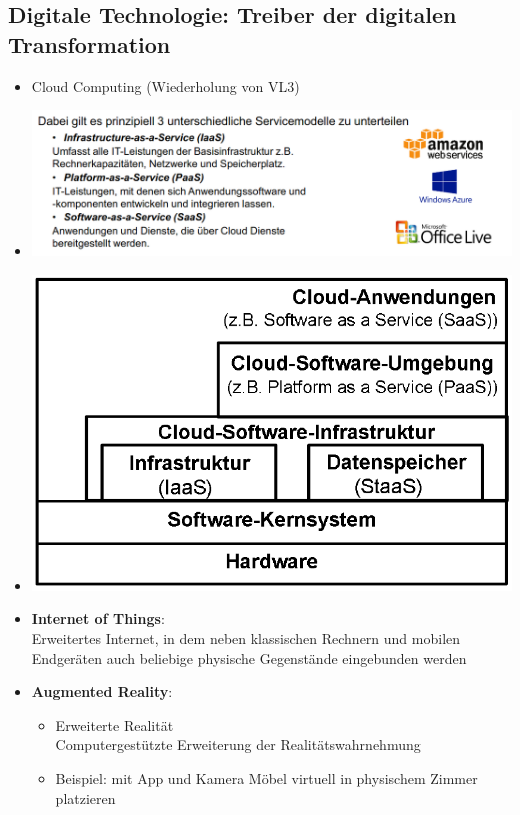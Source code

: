 \documentclass[12pt,a4paper]{article}
\begin{document}
\subsection{Digitale Technologie: Treiber der digitalen Transformation} %
\begin{itemize}
   \item Cloud Computing (Wiederholung von VL3)
   \item[] \includegraphics[scale=0.4]{repeat.png}
   \item[] \hspace*{0.5cm} \includegraphics[scale=0.3]{CloudComputingKonzept.png}
   
   \item \textbf{Internet of Things}:\\
         Erweitertes Internet, in dem neben klassischen Rechnern und mobilen Endgeräten auch beliebige physische Gegenstände eingebunden werden

   \item \textbf{Augmented Reality}:
      \begin{itemize}
			\item Erweiterte Realität\\
			      Computergestützte Erweiterung der Realitätswahrnehmung
			\item Beispiel: mit App und Kamera Möbel virtuell in physischem Zimmer platzieren
      \end{itemize}


\end{itemize}
\end{document}
